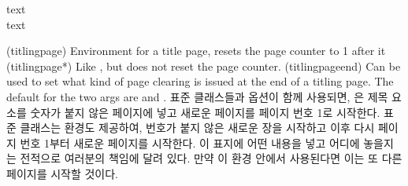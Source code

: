 
\begin{syntax}
 text  \\
 text \\
\cmd{\titlingpageend} 
\end{syntax}
\glossary(titlingpage)%
  {}%
  {Environment for a title page, resets the page counter to 1 after it}
\glossary(titlingpage*)%
  {}%
  {Like , but does not reset the page counter.}%
\glossary(titlingpageend)%
  {}%
  {Can be used to set what kind of page clearing is issued at the end
    of a titling page. The default for the two args are
     and .}
표준 클래스들과  옵션이 함께 사용되면, \cmd{\maketitle}은
제목 요소를 숫자가 붙지 않은 페이지에 넣고 새로운 페이지를 페이지 번호 1로
시작한다.
표준 클래스는  환경도 제공하여, 번호가 붙지 않은 새로운 장을
시작하고 이후 다시 페이지 번호 1부터 새로운 페이지를 시작한다.
이 표지에 어떤 내용을 넣고 어디에 놓을지는 전적으로 여러분의 책임에 달려 있다.
만약 \cmd{\maketitle}이  환경 안에서 사용된다면 이는 또 다른
페이지를 시작할 것이다.

